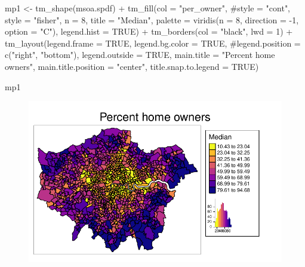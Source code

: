 \documentclass[
  letterpaper,
]{scrbook}
\newenvironment{Shaded}{\begin{snugshade}}{\end{snugshade}}
\newcommand{\AttributeTok}[1]{\textcolor[rgb]{0.40,0.45,0.13}{#1}}
\newcommand{\CommentTok}[1]{\textcolor[rgb]{0.37,0.37,0.37}{#1}}
\newcommand{\ConstantTok}[1]{\textcolor[rgb]{0.56,0.35,0.01}{#1}}
\newcommand{\DecValTok}[1]{\textcolor[rgb]{0.68,0.00,0.00}{#1}}
\newcommand{\FunctionTok}[1]{\textcolor[rgb]{0.28,0.35,0.67}{#1}}
\newcommand{\NormalTok}[1]{\textcolor[rgb]{0.00,0.23,0.31}{#1}}
\newcommand{\OtherTok}[1]{\textcolor[rgb]{0.00,0.23,0.31}{#1}}
\newcommand{\SpecialCharTok}[1]{\textcolor[rgb]{0.37,0.37,0.37}{#1}}
\newcommand{\StringTok}[1]{\textcolor[rgb]{0.13,0.47,0.30}{#1}}
\begin{document}
\begin{Shaded}
\begin{Highlighting}[]
\NormalTok{mp1 }\OtherTok{\textless{}{-}} \FunctionTok{tm\_shape}\NormalTok{(msoa.spdf) }\SpecialCharTok{+}
  \FunctionTok{tm\_fill}\NormalTok{(}\AttributeTok{col =} \StringTok{"per\_owner"}\NormalTok{, }
          \CommentTok{\#style = "cont",}
          \AttributeTok{style =} \StringTok{"fisher"}\NormalTok{, }\AttributeTok{n =} \DecValTok{8}\NormalTok{,}
          \AttributeTok{title =} \StringTok{"Median"}\NormalTok{, }
          \AttributeTok{palette =} \FunctionTok{viridis}\NormalTok{(}\AttributeTok{n =} \DecValTok{8}\NormalTok{, }\AttributeTok{direction =} \SpecialCharTok{{-}}\DecValTok{1}\NormalTok{, }\AttributeTok{option =} \StringTok{"C"}\NormalTok{),}
          \AttributeTok{legend.hist =} \ConstantTok{TRUE}\NormalTok{) }\SpecialCharTok{+}
  \FunctionTok{tm\_borders}\NormalTok{(}\AttributeTok{col =} \StringTok{"black"}\NormalTok{, }\AttributeTok{lwd =} \DecValTok{1}\NormalTok{) }\SpecialCharTok{+}
  \FunctionTok{tm\_layout}\NormalTok{(}\AttributeTok{legend.frame =} \ConstantTok{TRUE}\NormalTok{, }\AttributeTok{legend.bg.color =} \ConstantTok{TRUE}\NormalTok{,}
            \CommentTok{\#legend.position = c("right", "bottom"),}
            \AttributeTok{legend.outside =} \ConstantTok{TRUE}\NormalTok{,}
            \AttributeTok{main.title =} \StringTok{"Percent home owners"}\NormalTok{, }
            \AttributeTok{main.title.position =} \StringTok{"center"}\NormalTok{,}
            \AttributeTok{title.snap.to.legend =} \ConstantTok{TRUE}\NormalTok{) }

\NormalTok{mp1 }
\end{Highlighting}
\end{Shaded}

\begin{figure}[H]

{\centering \includegraphics{04_dependence_files/figure-pdf/unnamed-chunk-4-1.pdf}

}

\end{figure}
\end{document}
